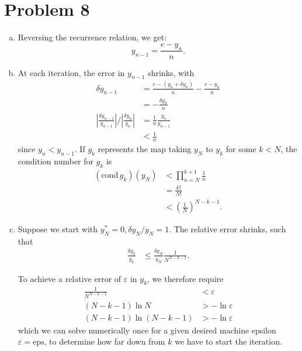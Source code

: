 \documentclass[12pt]{article}
\begin{document}
\section*{Problem 8}
\begin{enumerate}[(a)]
\item
Reversing the recurrence relation, we get:
\begin{equation*}
y_{n-1} = \frac{e - y_n}{n}.
\end{equation*}

\item
At each iteration, the error in $y_{n-1}$ shrinks, with
\begin{equation*}
\begin{aligned}
\delta y_{n-1} &= \frac{e - (y_n + \delta y_n)}{n} - \frac{e - y_n}{n} \\
&= -\frac{\delta y_n}{n} \\
\left|\frac{\delta y_{n-1}}{y_{n-1}}\right| / \left|\frac{\delta y_{n}}{y_{n}}\right| &= \frac{1}{n}\frac{y_n}{y_{n-1}} \\
&< \frac{1}{n}
\end{aligned}
\end{equation*}
since $y_{n} < y_{n-1}$. If $g_k$ represents the map taking $y_N$ to $y_k$ for some $k < N$, the condition number for $g_k$ is
\begin{equation*}
\begin{aligned}
(\mathrm{cond}\,g_k)(y_N) &< \prod_{n=N}^{k+1}\frac{1}{n} \\
&= \frac{k!}{N!} \\
&< \left(\frac{1}{N}\right)^{N-k-1}.
\end{aligned}
\end{equation*}


\item 
Suppose we start with $y_N^* = 0, \delta y_N / y_N = 1$. The relative error shrinks, such that
\begin{equation*}
\begin{aligned}
\frac{\delta y_k}{y_k} &\leq \frac{\delta y_N}{y_N} \frac{1}{N^{N-k-1}}.
\end{aligned}
\end{equation*}

To achieve a relative error of $\varepsilon$ in $y_k$, we therefore require
\begin{equation*}
\begin{aligned}
\frac{1}{N^{N-k-1}} &< \varepsilon \\
(N - k - 1)\ln{N} &> -\ln{\varepsilon} \\
(N - k - 1)\ln{(N-k-1)} &> -\ln{\varepsilon}
\end{aligned}
\end{equation*}
which we can solve numerically once for a given desired machine epsilon $\varepsilon = \mathrm{eps}$, to determine how far down from $k$ we have to start the iteration.



\end{enumerate}
\end{document}
